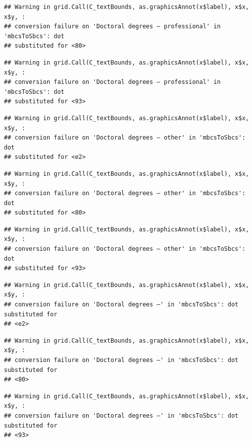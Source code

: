 \documentclass[
]{book}
\begin{document}
\begin{verbatim}
## Warning in grid.Call(C_textBounds, as.graphicsAnnot(x$label), x$x, x$y, :
## conversion failure on 'Doctoral degrees – professional' in 'mbcsToSbcs': dot
## substituted for <80>
\end{verbatim}

\begin{verbatim}
## Warning in grid.Call(C_textBounds, as.graphicsAnnot(x$label), x$x, x$y, :
## conversion failure on 'Doctoral degrees – professional' in 'mbcsToSbcs': dot
## substituted for <93>
\end{verbatim}

\begin{verbatim}
## Warning in grid.Call(C_textBounds, as.graphicsAnnot(x$label), x$x, x$y, :
## conversion failure on 'Doctoral degrees – other' in 'mbcsToSbcs': dot
## substituted for <e2>
\end{verbatim}

\begin{verbatim}
## Warning in grid.Call(C_textBounds, as.graphicsAnnot(x$label), x$x, x$y, :
## conversion failure on 'Doctoral degrees – other' in 'mbcsToSbcs': dot
## substituted for <80>
\end{verbatim}

\begin{verbatim}
## Warning in grid.Call(C_textBounds, as.graphicsAnnot(x$label), x$x, x$y, :
## conversion failure on 'Doctoral degrees – other' in 'mbcsToSbcs': dot
## substituted for <93>
\end{verbatim}

\begin{verbatim}
## Warning in grid.Call(C_textBounds, as.graphicsAnnot(x$label), x$x, x$y, :
## conversion failure on 'Doctoral degrees –' in 'mbcsToSbcs': dot substituted for
## <e2>
\end{verbatim}

\begin{verbatim}
## Warning in grid.Call(C_textBounds, as.graphicsAnnot(x$label), x$x, x$y, :
## conversion failure on 'Doctoral degrees –' in 'mbcsToSbcs': dot substituted for
## <80>
\end{verbatim}

\begin{verbatim}
## Warning in grid.Call(C_textBounds, as.graphicsAnnot(x$label), x$x, x$y, :
## conversion failure on 'Doctoral degrees –' in 'mbcsToSbcs': dot substituted for
## <93>
\end{verbatim}
\end{document}
